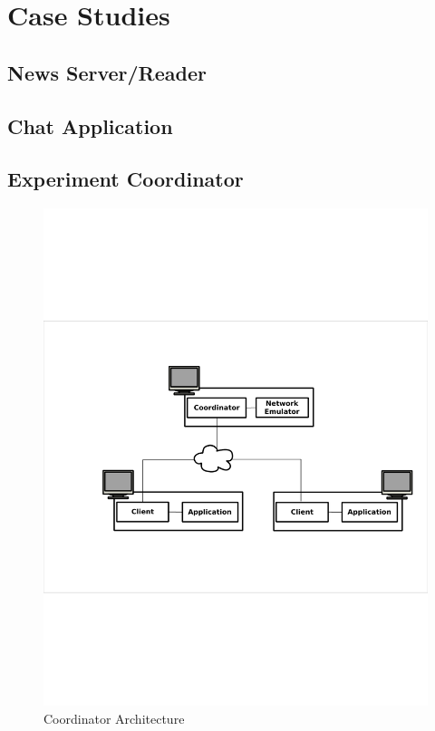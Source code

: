 \chapter{Case Studies}

\section{News Server/Reader}

\section{Chat Application}

\section{Experiment Coordinator}

\begin{figure}
\centering
\includegraphics[scale = .34, clip, trim = 94px 279px 24px 252px]{figures/experiment_arch.pdf}
\caption{Coordinator Architecture}
\label{fig:coordarchitecture}
\end{figure}

